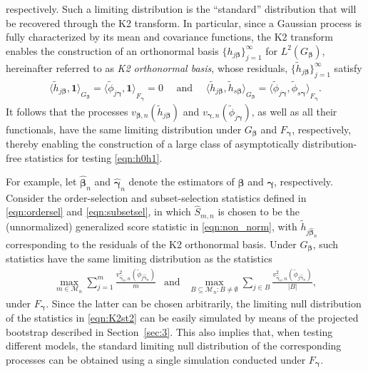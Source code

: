 \documentclass[11pt]{article}
\newcommand{\vect}[1]{\boldsymbol{#1}}
\newcommand{\thjn}{\widetilde{h}_{j\widehat{\vect{\beta}}_n}}
\begin{document}
respectively.
Such a limiting distribution is the ``standard'' distribution that will be recovered through the K2 transform.
In particular, since a Gaussian process is fully characterized by its mean and covariance functions, the K2 transform enables the construction of an orthonormal basis $\{h_{j\vect{\beta}}\}_{j=1}^\infty$ for $L^2(G_{\vect{\beta}})$, hereinafter referred to as \emph{K2 orthonormal basis}, whose  residuals, $\{\widetilde{h}_{j\vect{\beta}}\}_{j=1}^\infty$ satisfy
\begin{equation*}
\begin{aligned}
\bigl\langle{\widetilde{h}_{j\vect{\beta}},\vect{1}\bigl\rangle}_{{G_{\vect{\beta}}}}= \bigl\langle{\widetilde{\phi}_{j\vect{\gamma}},\vect{1}\bigl\rangle}_{{F_{\vect{\gamma}}}} = 0 \quad  \text { and } \quad
\bigl\langle{\widetilde{h}_{j\vect{\beta}}, \widetilde{h}_{s\vect{\beta}}\bigl\rangle}_{G_{\vect{\beta}}} = \bigl\langle{\widetilde{\phi}_{j\vect{\gamma}}, \widetilde{\phi}_{s\vect{\gamma}}\bigl\rangle}_{F_{\vect{\gamma}}}.
\label{eqn:meanvar}
\end{aligned}
\end{equation*}
It follows that the processes $v_{\vect{\beta},n}(\widetilde{h}_{j\vect{\beta}})$ and $v_{\vect{\gamma},n}(\widetilde{\phi}_{j\vect{\gamma}})$, as well as all their functionals, have the same limiting distribution under $G_{\vect{\beta}}$ and $F_{\vect{\gamma}}$, respectively, thereby enabling the construction of a large class of asymptotically distribution-free statistics for testing \eqref{eqn:h0h1}.

For example, let $\widehat{\vect{\beta}}_n$ and $\widehat{\vect{\gamma}}_n$ denote the estimators of $\vect{\beta}$ and $\vect{\gamma}$, respectively.
Consider the order-selection and subset-selection statistics defined in \eqref{eqn:ordersel} and \eqref{eqn:subsetsel}, in which $\widehat{S}_{m,n}$ is chosen to be the (unnormalized) generalized score statistic in \eqref{eqn:non_norm}, with $\thjn$ corresponding to the residuals of the K2 orthonormal basis. Under $G_{\vect{\beta}}$, such statistics have the same limiting distribution as
the statistics
\begin{equation}
\begin{aligned}
    \max_{{m\in \mathcal{M}_n}} \sum_{j=1}^m\frac{ v^2_{\widehat{\vect{\gamma}}_n,n}(\widetilde{\phi}_{j\widehat{\vect{\gamma}}_n})}{m} \ \ \text{ and } \ \ 
    \max_{{B \subseteq \mathcal{M}_n:B\neq \emptyset}}\sum_{j\in B} \frac{v^2_{\widehat{\vect{\gamma}}_n,n}(\widetilde{\phi}_{j\widehat{\vect{\gamma}}_n})}{|B|},
\label{eqn:K2st2}
\end{aligned}
\end{equation}
under $F_{\vect{\gamma}}$. Since the latter can be chosen arbitrarily, the limiting null distribution of the statistics in \eqref{eqn:K2st2} can be easily simulated by means of the projected bootstrap described in Section~\ref{sec:3}. This also implies that, when testing different models, the standard limiting null distribution of the corresponding processes can be obtained using a single simulation conducted under $F_{\vect{\gamma}}$. 
\end{document}
